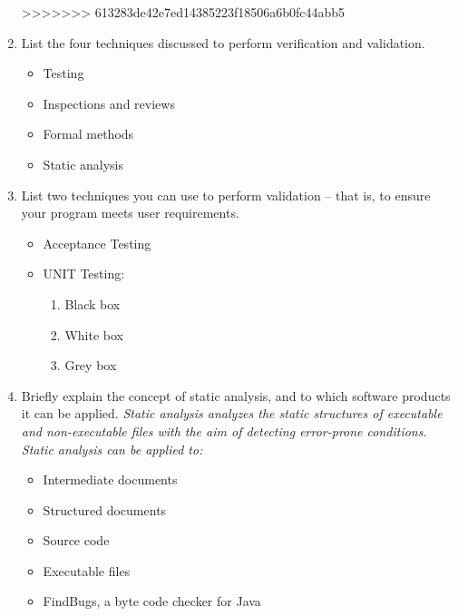 \documentclass[11pt]{article}
\begin{document}
\begin{enumerate}
        \color{black}
>>>>>>> 613283de42e7ed14385223f18506a6b0fc44abb5
        
        \item List the four techniques discussed to perform verification and validation.
        \begin{itemize}
            \item Testing
            \item Inspections and reviews
            \item Formal methods
            \item Static analysis
        \end{itemize}
        
        
        \item List two techniques you can use to perform validation -- that is, to ensure your program meets user requirements. 
        \begin{itemize}
            \item Acceptance Testing
            \item UNIT Testing:
            \begin{enumerate}
                \item Black box
                \item White box
                \item Grey box
            \end{enumerate}
        \end{itemize}
        
        \item Briefly explain the concept of static analysis, and to which software products it can be applied.
        \newline 
       \textit{Static analysis analyzes the static structures of executable and non-executable files with the aim of detecting error-prone conditions. Static analysis can be applied to:}
        \begin{itemize}
            \item Intermediate documents
            \item Structured documents
            \item Source code
            \item Executable files
            \item FindBugs, a byte code checker for Java
        \end{itemize}
        

\end{enumerate}
\end{document}
